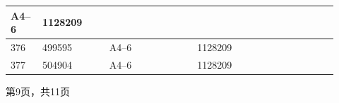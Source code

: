 \documentclass[UTF8,10pt,a4paper,fontset=fandol]{ctexart}
\newcommand{\fieldvalue}[1]{#1}
\begin{document}
\begin{center}
\begin{tabular}{|p{0.08\linewidth}|p{0.19\linewidth}|p{0.25\linewidth}|p{0.25\linewidth}|p{0.15\linewidth}|}
\fieldvalue{A4--6} &
\fieldvalue{1128209} & \\ \hline
\fieldvalue{376} &
\fieldvalue{499595} &
\fieldvalue{A4--6} &
\fieldvalue{1128209} & \\ \hline
\fieldvalue{377} &
\fieldvalue{504904} &
\fieldvalue{A4--6} &
\fieldvalue{1128209} & \\ \hline
\end{tabular}

\vspace{6pt}

第9页，共11页
\end{center}

\newpage
\end{document}

